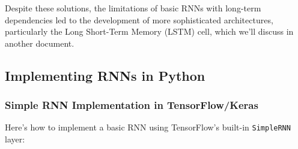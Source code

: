 \documentclass[
  letterpaper,
  DIV=11,
  numbers=noendperiod]{scrreprt}
\begin{document}
Despite these solutions, the limitations of basic RNNs with long-term
dependencies led to the development of more sophisticated architectures,
particularly the Long Short-Term Memory (LSTM) cell, which we'll discuss
in another document.

\subsection{Implementing RNNs in
Python}\label{implementing-rnns-in-python}

\subsubsection{Simple RNN Implementation in
TensorFlow/Keras}\label{simple-rnn-implementation-in-tensorflowkeras}

Here's how to implement a basic RNN using TensorFlow's built-in
\texttt{SimpleRNN} layer:
\end{document}
